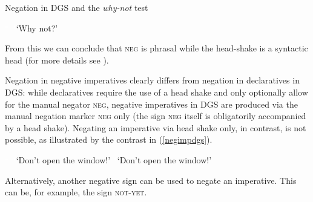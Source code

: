 \begin{digression}{Negation in DGS and the \textit{why-not} test}{}
\begin{exe}
\begin{xlist}
\ex\label{ex:modaldoublingnegb} \textcolor{white}{*}
\glt \textcolor{white}{*}`Why not?'
\end{xlist}
\end{exe}


\noindent From this we can conclude that \textsc{neg} is phrasal while the head-shake is a syntactic head (for more details see \citealt{pfau2016featural}).



\end{digression}

\noindent Negation in negative imperatives clearly differs from negation in declaratives in DGS: while declaratives require the use of a head shake and only optionally allow for the manual negator \textsc{neg}, negative imperatives in DGS are produced via the manual negation marker \textsc{neg} only (the sign \textsc{neg} itself is obligatorily accompanied by a head shake). Negating an imperative via head shake only, in contrast, is not possible, as illustrated by the contrast in (\ref{negimpdgs}).

\begin{exe}
\ex\label{negimpdgs}\begin{xlist}
\ex\label{negimpdgsa} \textcolor{white}{*}
\glt \textcolor{white}{*}`Don't open the window!'
\ex *
\glt \textcolor{white}{*}`Don't open the window!'
\end{xlist}
\end{exe}

\noindent Alternatively, another negative sign can be used to negate an imperative. This can be, for example, the sign \textsc{not-yet}. %

